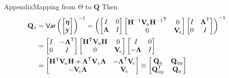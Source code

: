 \documentclass[xcolor=svgnames, 10pt, aspectratio=169]{beamer}
\newcommand\transpose[1]{{#1}^{\sf{T}}}
\begin{document}
\begin{frame}{Appendix}{Mapping from $\Theta$ to $\mathbf{Q}$}
Then 
\begin{align*}
    \mathbf{Q}_z 
    &= 
    \text{\sf{Var}}\left(
    \begin{bmatrix}
        \boldsymbol{\eta} \\
        \mathbf{y}
    \end{bmatrix}
    \right)^{-1} 
    =  
    \left(
    \begin{bmatrix}
        I & 0 \\
        \boldsymbol{\Lambda} & I
    \end{bmatrix}
    \begin{bmatrix}
        \mathbf{H}^{-1} \mathbf{V}_{\!u} \transpose{\mathbf{H}^{-1}} & 0 \\
        0 & \mathbf{V}_{\!e}
    \end{bmatrix} 
    \begin{bmatrix}
        I & \transpose{\boldsymbol{\Lambda}} \\
        0 & I
    \end{bmatrix}
    \right)^{-1}\\
    &=
    \begin{bmatrix}
        I & -\transpose{\boldsymbol{\Lambda}} \\
        0 & I
    \end{bmatrix}
    \begin{bmatrix}
        \transpose{\mathbf{H}} \mathbf{V}_{\!u} \mathbf{H} & 0 \\
        0 & \mathbf{V}_{\!e}
    \end{bmatrix} 
    \begin{bmatrix}
        I & 0 \\
        -\boldsymbol{\Lambda} & I 
    \end{bmatrix} \\
    &=
    \begin{bmatrix}
         \transpose{\mathbf{H}} \mathbf{V}_{\!u} \mathbf{H} + \transpose{\boldsymbol{\Lambda}}\mathbf{V}_{e}\boldsymbol{\Lambda}  & -\transpose{\boldsymbol{\Lambda}} \mathbf{V}_{\!e} \\
         -\mathbf{V}_{\!e} \boldsymbol{\Lambda} & \mathbf{V}_{\!e}
    \end{bmatrix}
    \equiv 
    \begin{bmatrix}
        \mathbf{Q}_{\eta} & \mathbf{Q}_{\eta y} \\
        \transpose{\mathbf{Q}}_{\eta y} & \mathbf{Q}_{y}  
    \end{bmatrix}
\end{align*}

\end{frame}
\end{document}

